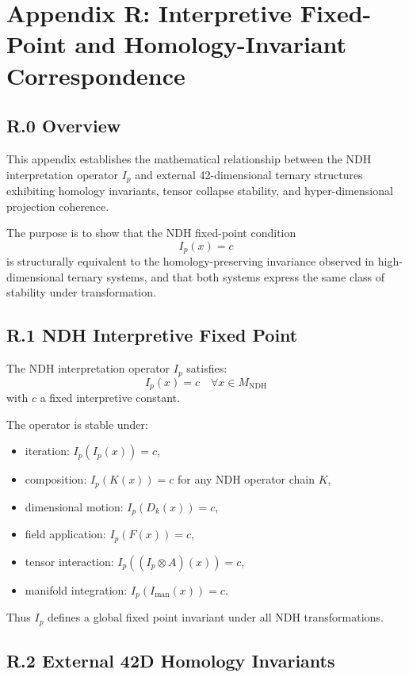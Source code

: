 \appendix
\section*{Appendix R: Interpretive Fixed-Point and Homology-Invariant Correspondence}

\subsection*{R.0 Overview}

This appendix establishes the mathematical relationship between the NDH
interpretation operator $I_p$ and external 42-dimensional ternary
structures exhibiting homology invariants, tensor collapse stability, and
hyper-dimensional projection coherence.

The purpose is to show that the NDH fixed-point condition
\[
I_p(x) = c
\]
is structurally equivalent to the homology-preserving invariance observed
in high-dimensional ternary systems, and that both systems express the
same class of stability under transformation.

\subsection*{R.1 NDH Interpretive Fixed Point}

The NDH interpretation operator $I_p$ satisfies:
\[
I_p(x) = c
\quad\forall x \in M_{\mathrm{NDH}}
\]
with $c$ a fixed interpretive constant.

The operator is stable under:
\begin{itemize}
    \item iteration: $I_p(I_p(x)) = c$,
    \item composition: $I_p(K(x)) = c$ for any NDH operator chain $K$,
    \item dimensional motion: $I_p(D_k(x)) = c$,
    \item field application: $I_p(F(x)) = c$,
    \item tensor interaction: $I_p((I_p \otimes A)(x)) = c$,
    \item manifold integration: $I_p(I_{\mathrm{man}}(x)) = c$.
\end{itemize}

Thus $I_p$ defines a global fixed point invariant under all NDH
transformations.

\subsection*{R.2 External 42D Homology Invariants}

